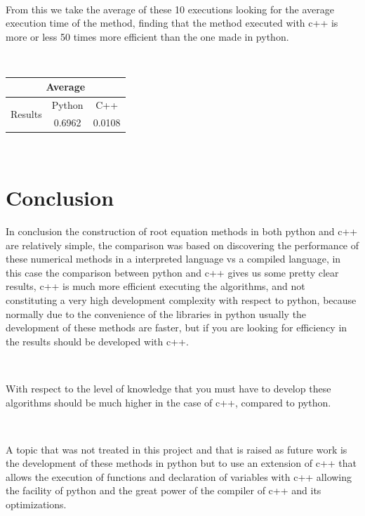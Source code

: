 \documentclass[conference]{IEEEtran}
\begin{document}
\



From this we take the average of these 10 executions looking for the average execution time of the method, finding that the method executed with c++ is more or less 50 times more efficient than the one made in python.

\



\begin{tabular}{|c|c|c|}
\hline
\multicolumn{3}{|c|}{Average}              \\ \hline
\multirow{2}{*}{Results} & Python & C++    \\ \cline{2-3} 
                         & 0.6962 & 0.0108 \\ \hline
\end{tabular}





\



\section{Conclusion}
In conclusion the construction of root equation methods in both python and c++ are relatively simple, the comparison was based on discovering the performance of these numerical methods in a interpreted language vs a compiled language, in this case the comparison between python and c++ gives us some pretty clear results, c++ is much more efficient executing the algorithms, and not constituting a very high development complexity with respect to python, because normally due to the convenience of the libraries in python usually the development of these methods are faster, but if you are looking for efficiency in the results should be developed with c++. 

\

With respect to the level of knowledge that you must have to develop these algorithms should be much higher in the case of c++, compared to python. 

\

A topic that was not treated in this project and that is raised as future work is the development of these methods in python but to use an extension of c++ that allows the execution of functions and declaration of variables with c++ allowing the facility of python and the great power of the compiler of c++ and its optimizations. 

\
\end{document}
